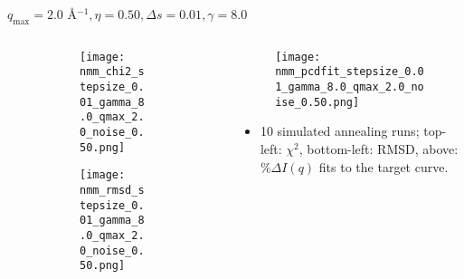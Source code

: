 \documentclass{beamer}
\begin{document}
\begin{frame}{$ q_{\textrm{max}}=2.0 $ \AA $^{-1}, \eta=0.50, \Delta s=0.01, \gamma=8.0$}
	\begin{columns}
		\begin{column}{.5\textwidth}
			\begin{figure}[H]
			\centering
			\begin{subfigure}[b]{\textwidth}
				\centering
				\texttt{[image: nmm\_chi2\_stepsize\_0.01\_gamma\_8.0\_qmax\_2.0\_noise\_0.50.png]}
				\label{fig:}
			\end{subfigure}
			\begin{subfigure}[b]{\textwidth}
				\centering
				\texttt{[image: nmm\_rmsd\_stepsize\_0.01\_gamma\_8.0\_qmax\_2.0\_noise\_0.50.png]}
				\label{fig:}
			\end{subfigure}
			\end{figure}
		\end{column}
		\begin{column}{.5\textwidth}
			\begin{figure}[H]
				\centering
				\texttt{[image: nmm\_pcdfit\_stepsize\_0.01\_gamma\_8.0\_qmax\_2.0\_noise\_0.50.png]}
				\label{fig:}
			\end{figure}
			\begin{itemize}
				\item 10 simulated annealing runs; top-left: $\chi^2$, bottom-left: RMSD, above: $\%\Delta I(q)$ fits to the target curve.
			\end{itemize}
		\end{column}
	\end{columns}
\end{frame}
 
\end{document}
